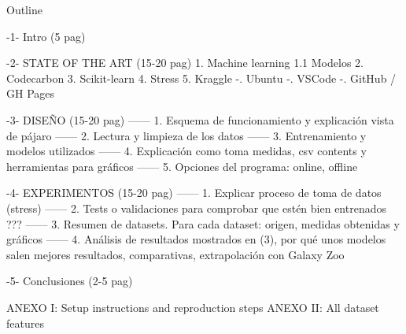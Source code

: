 Outline

-1- Intro (5 pag)

-2- STATE OF THE ART  (15-20 pag)
1. Machine learning
  1.1 Modelos
2. Codecarbon
3. Scikit-learn
4. Stress
5. Kraggle
-. Ubuntu
-. VSCode
-. GitHub / GH Pages

-3- DISEÑO (15-20 pag)
------ 1. Esquema de funcionamiento y explicación vista de pájaro
------ 2. Lectura y limpieza de los datos
------ 3. Entrenamiento y modelos utilizados
------ 4. Explicación como toma medidas, csv contents y herramientas para gráficos
------ 5. Opciones del programa: online, offline

-4- EXPERIMENTOS (15-20 pag)
------ 1. Explicar proceso de toma de datos (stress)
------ 2. Tests o validaciones para comprobar que estén bien entrenados ???
------ 3. Resumen de datasets. Para cada dataset: origen, medidas obtenidas y gráficos
------ 4. Análisis de resultados mostrados en (3), por qué unos modelos salen mejores resultados, comparativas, extrapolación con Galaxy Zoo

-5- Conclusiones (2-5 pag)

ANEXO I: Setup instructions and reproduction steps
ANEXO II: All dataset features


